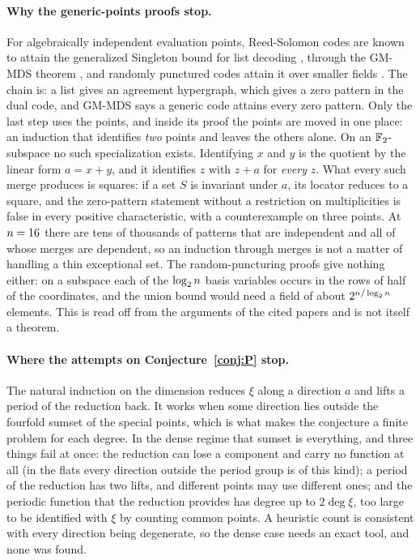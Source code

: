 \paragraph{Why the generic-points proofs stop.} For algebraically independent evaluation points, Reed-Solomon codes are known to attain the generalized Singleton bound for list decoding \cite{BGM}, through the GM-MDS theorem \cite{Lovett,YH}, and randomly punctured codes attain it over smaller fields \cite{GZ,AGGLZ}. The chain is: a list gives an agreement hypergraph, which gives a zero pattern in the dual code, and GM-MDS says a generic code attains every zero pattern. Only the last step uses the points, and inside its proof the points are moved in one place: an induction that identifies \emph{two} points and leaves the others alone. On an $\mathbb{F}_2$-subspace no such specialization exists. Identifying $x$ and $y$ is the quotient by the linear form $a=x+y$, and it identifies $z$ with $z+a$ for \emph{every} $z$. What every such merge produces is squares: if a set $S$ is invariant under $a$, its locator reduces to a square, and the zero-pattern statement without a restriction on multiplicities is false in every positive characteristic, with a counterexample on three points. At $n=16$ there are tens of thousands of patterns that are independent and all of whose merges are dependent, so an induction through merges is not a matter of handling a thin exceptional set. The random-puncturing proofs give nothing either: on a subspace each of the $\log_2n$ basis variables occurs in the rows of half of the coordinates, and the union bound would need a field of about $2^{n/\log_2n}$ elements. This is read off from the arguments of the cited papers and is not itself a theorem.

\paragraph{Where the attempts on Conjecture~\ref{conj:P} stop.} The natural induction on the dimension reduces $\xi$ along a direction $a$ and lifts a period of the reduction back. It works when some direction lies outside the fourfold sumset of the special points, which is what makes the conjecture a finite problem for each degree. In the dense regime that sumset is everything, and three things fail at once: the reduction can lose a component and carry no function at all (in the flats every direction outside the period group is of this kind); a period of the reduction has two lifts, and different points may use different ones; and the periodic function that the reduction provides has degree up to $2\deg\xi$, too large to be identified with $\xi$ by counting common points. A heuristic count is consistent with every direction being degenerate, so the dense case needs an exact tool, and none was found.

